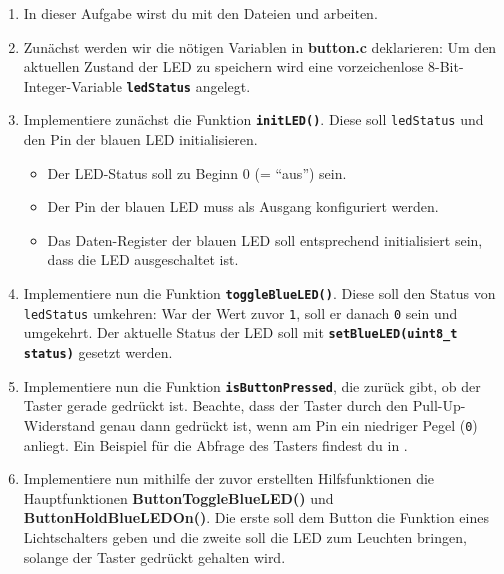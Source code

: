 \begin{enumerate}
\item 
In dieser Aufgabe wirst du mit den Dateien  und  arbeiten.

\item 
Zunächst werden wir die nötigen Variablen in \textbf{button.c} deklarieren:
Um den aktuellen Zustand der LED zu speichern wird eine vorzeichenlose 8-Bit-Integer-Variable \textbf{\lstinline|ledStatus|} angelegt.

\item
Implementiere zunächst die Funktion \textbf{\lstinline|initLED()|}.
Diese soll \lstinline|ledStatus| und den Pin der blauen LED initialisieren.
\begin{itemize}
\item 
Der LED-Status soll zu Beginn 0 (= \enquote{aus}) sein.
\item
Der Pin der blauen LED muss als Ausgang konfiguriert werden.
\item 
Das Daten-Register der blauen LED soll entsprechend initialisiert sein, dass die LED ausgeschaltet ist.
\end{itemize}

\item
Implementiere nun die Funktion \textbf{\lstinline|toggleBlueLED()|}.
Diese soll den Status von \lstinline|ledStatus| umkehren:
War der Wert zuvor \lstinline|1|, soll er danach \lstinline|0| sein und umgekehrt.
Der aktuelle Status der LED soll mit \textbf{\lstinline|setBlueLED(uint8_t status)|} gesetzt werden.

\item 
Implementiere nun die Funktion \textbf{\lstinline|isButtonPressed|}, die zurück gibt, ob der Taster gerade gedrückt ist.
Beachte, dass der Taster durch den Pull-Up-Widerstand genau dann gedrückt ist, wenn am Pin ein niedriger Pegel (\lstinline|0|) anliegt.
Ein Beispiel für die Abfrage des Tasters findest du in .

\item
Implementiere nun mithilfe der zuvor erstellten Hilfsfunktionen die Hauptfunktionen \textbf{ButtonToggleBlueLED()} und \textbf{ButtonHoldBlueLEDOn()}.
Die erste soll dem Button die Funktion eines Lichtschalters geben und die zweite soll die LED zum Leuchten bringen, solange der Taster gedrückt gehalten wird. 

\end{enumerate}
